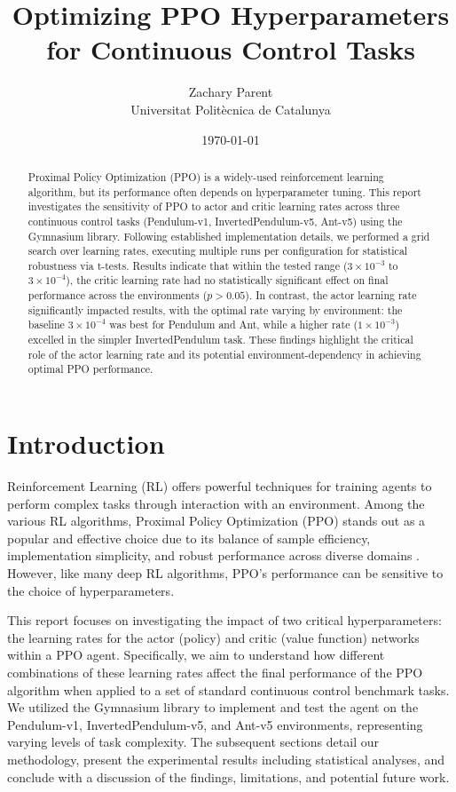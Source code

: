 \documentclass{article}
\title{Optimizing PPO Hyperparameters \\ for Continuous Control Tasks}
\author{Zachary Parent \\ Universitat Politècnica de Catalunya}
\date{\today}
\begin{document}
\maketitle

\begin{abstract}
Proximal Policy Optimization (PPO) is a widely-used reinforcement learning algorithm, but its performance often depends on hyperparameter tuning. This report investigates the sensitivity of PPO to actor and critic learning rates across three continuous control tasks (Pendulum-v1, InvertedPendulum-v5, Ant-v5) using the Gymnasium library. Following established implementation details, we performed a grid search over learning rates, executing multiple runs per configuration for statistical robustness via t-tests. Results indicate that within the tested range (\(3 \times 10^{-3}\) to \(3 \times 10^{-4}\)), the critic learning rate had no statistically significant effect on final performance across the environments (\(p > 0.05\)). In contrast, the actor learning rate significantly impacted results, with the optimal rate varying by environment: the baseline \(3 \times 10^{-4}\) was best for Pendulum and Ant, while a higher rate (\(1 \times 10^{-3}\)) excelled in the simpler InvertedPendulum task. These findings highlight the critical role of the actor learning rate and its potential environment-dependency in achieving optimal PPO performance.
\end{abstract}

\section{Introduction}
Reinforcement Learning (RL) offers powerful techniques for training agents to perform complex tasks through interaction with an environment. Among the various RL algorithms, Proximal Policy Optimization (PPO) stands out as a popular and effective choice due to its balance of sample efficiency, implementation simplicity, and robust performance across diverse domains \cite{schulman2017proximalpolicyoptimizationalgorithms}. However, like many deep RL algorithms, PPO's performance can be sensitive to the choice of hyperparameters.

This report focuses on investigating the impact of two critical hyperparameters: the learning rates for the actor (policy) and critic (value function) networks within a PPO agent. Specifically, we aim to understand how different combinations of these learning rates affect the final performance of the PPO algorithm when applied to a set of standard continuous control benchmark tasks. We utilized the Gymnasium library \cite{towers2024gymnasium} to implement and test the agent on the Pendulum-v1, InvertedPendulum-v5, and Ant-v5 environments, representing varying levels of task complexity. The subsequent sections detail our methodology, present the experimental results including statistical analyses, and conclude with a discussion of the findings, limitations, and potential future work.
\end{document}
